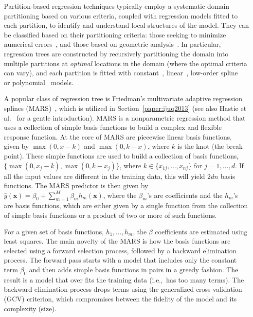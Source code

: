 Partition-based regression techniques typically employ a systematic domain partitioning based on various criteria, coupled with regression models fitted to each partition, to identify and understand local structures of the model.
%
They can be classified based on their partitioning criteria: those seeking to minimize numerical errors~\cite{Friedman1991,AlexanderGrimshaw1996,BreimanFriedmanOlshen1984a,ChaudhuriHuangLoh1994,ChipmanMcCulloch2010}, and those based on geometric analysis~\cite{GerberPotter2012,GerberRubelBremer2011,LiLueChen2000}.
%
In particular, regression trees are constructed by recursively partitioning the domain into multiple partitions at \emph{optimal} locations in the domain (where the optimal criteria can vary), and each partition is fitted with constant~\cite{BreimanFriedmanOlshen1984a}, linear~\cite{AlexanderGrimshaw1996,LiLueChen2000}, low-order spline~\cite{Friedman1991} or polynomial~\cite{ChaudhuriHuangLoh1994} models.

A popular class of regression tree is Friedman's multivariate adaptive regression splines (MARS)~\cite{Friedman1991}, which is utilized in Section~\ref{paper:ijuq2013} (see also Hastie et al.~\cite{HastieTibshiraniFriedman2008} for a gentle introduction).
%
MARS is a nonparametric regression method that uses a collection of simple basis functions to build a complex and flexible response function.
%
At the core of MARS are piecewise linear basis functions, given by $\max(0, x - k)$ and $\max(0, k - x)$, where $k$ is the knot (the break point).
%
These simple functions are used to build a collection of basis functions, $\{\max(0, x_j-k), \max(0,k-x_j)\}$, where $k \in \{x_{1j}, \dots, x_{nj}\}$ for $j = 1, \dots, d$.
%
If all the input values are different in the training data, this will yield $2dn$ basis functions. The MARS predictor is then given by $\hat{y}(\mathbf{x}) = \beta_0 + \sum_{m=1}^M \beta_m h_m(\mathbf{x})$, where the $\beta_m$'s are coefficients and the $h_m$'s are basis functions, which are either given by a single function from the collection of simple basis functions or a product of
two or more of such functions.

For a given set of basis functions, $h_1, \dots, h_m$, the $\beta$ coefficients are estimated using least squares.
%
The main novelty of the MARS is how the basis functions are selected using a forward selection process, followed by a backward elimination process.
%
The forward pass starts with a model that includes only the constant term $\beta_0$ and then adds simple basis functions in pairs in a greedy fashion.
%
The result is a model that over fits the training data (i.e.,\ has too many terms).
%
The backward elimination process drops terms using the generalized cross-validation (GCV) criterion, which compromises between the fidelity of the model and its complexity (size).

